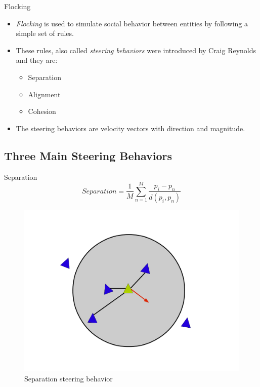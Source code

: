 \documentclass[red]{beamer}
\begin{document}
\begin{frame}{Flocking}
	\begin{itemize}
		\pause \item \textit{Flocking} is used to simulate social behavior between entities by following a simple set of rules.
		\pause \item These rules, also called \textit{steering behaviors} were introduced by Craig Reynolds and they are:
			\begin{itemize}
				\pause \item Separation
				\pause \item Alignment
				\pause \item Cohesion
			\end{itemize}
		\pause \item The steering behaviors are velocity vectors with direction and magnitude.
	\end{itemize}
\end{frame}

\subsection{Three Main Steering Behaviors}

\begin{frame}{Separation}
	\begin{equation}
	\label{separationEquation}
	Separation =\frac{1}{M} \sum_{n=1}^{M} \frac{p_i - p_n}{d(p_i,p_n)}
	\end{equation}
	
	\begin{figure}[htbp]
	\begin{center}
	\includegraphics[scale=0.15]{../figures/separation.pdf}
	\caption{Separation steering behavior}
	\label{separation}
	\end{center}
	\end{figure}
\end{frame}
\end{document}
